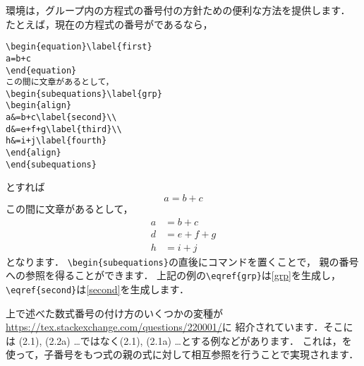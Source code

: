 環境は，グループ内の方程式の番号付の方針ための便利な方法を提供します．
たとえば，現在の方程式の番号が\theequation{}であるなら，
\begin{verbatim}
\begin{equation}\label{first}
a=b+c
\end{equation}
この間に文章があるとして，
\begin{subequations}\label{grp}
\begin{align}
a&=b+c\label{second}\\
d&=e+f+g\label{third}\\
h&=i+j\label{fourth}
\end{align}
\end{subequations}
\end{verbatim}
とすれば
\begin{equation}\label{first}
a=b+c
\end{equation}
この間に文章があるとして，
\begin{subequations}\label{grp}
\begin{align}
a&=b+c\label{second}\\
d&=e+f+g\label{third}\\
h&=i+j\label{fourth}
\end{align}
\end{subequations}
となります．
\verb'\begin{subequations}'の直後にコマンドを置くことで，
親の番号への参照を得ることができます．
上記の例の\verb'\eqref{grp}'は\eqref{grp}を生成し，
\verb'\eqref{second}'は\eqref{second}を生成します．

上で述べた数式番号の付け方のいくつかの変種が
\url{https://tex.stackexchange.com/questions/220001/}に
紹介されています．そこには
(2.1), (2.2a) \dots ではなく(2.1), (2.1a) \dots とする例などがあります．
これは，を使って，子番号をもつ式の親の式に対して相互参照を行うことで実現されます．

